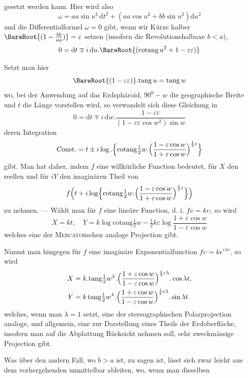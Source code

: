 %
\noindent gesetzt werden kann. Hier wird also
\[
\omega=aa\sin u^2\,\mathrm{d}t^2+(aa\cos u^2+bb\sin u^2)\mathrm{d}u^2
\]
\noindent und die Differentialformel \(\omega=0\) gibt, wenn wir Kürze halber \(\BareRoot{(1-\frac{bb}{aa})}=\varepsilon\) setzen (insofern die Revolutionshalbaxe \(b<a\)),
\[
0=\mathrm{d}t\mp i\,\mathrm{d}u\mathord{.}\BareRoot{(\mathrm{cotang}\,u^2+1-\varepsilon\varepsilon)}
\]

Setzt man hier
\[
\BareRoot{(1-\varepsilon\varepsilon)}\mathord{.}\mathrm{tang}\,u=\mathrm{tang}\,w
\]
\noindent wo, bei der Anwendung auf das Erdsphäroid, \(90^0-w\) die geographische Breite und \(t\) die Länge vorstellen wird, so verwandelt sich diese Gleichung in
\[
0=\mathrm{d}t\mp i\,\mathrm{d}w\mathord{.}\frac{1-\varepsilon\varepsilon}{(1-\varepsilon\varepsilon\cos w^2)\sin w}
\]
\noindent deren Integration
\[
\text{Const.}=t\pm i\log\mathord{.}\Bigl\{\mathrm{cotang}\tfrac{1}{2}w\mathord{.}\Bigl(\frac{1-\varepsilon\cos w}{1+\varepsilon\cos w}\Bigr)^{\frac{1}{2}\varepsilon}\Bigr\}
\]
\noindent gibt. Man hat daher, indem \(f\) eine willkürliche Function bedeutet, für \(X\) den reellen und für \(iY\) den imaginären Theil von
\[
f\Bigl(t+i\log\Bigl\{\mathrm{cotang}\tfrac{1}{2}w\mathord{.}\Bigl(\frac{1-\varepsilon\cos w}{1+\varepsilon\cos w}\Bigr)^{\frac{1}{2}\varepsilon}\Bigr\}\Bigr)
\]
\noindent zu nehmen. --- Wählt man für \(f\) eine lineäre Function, d. i. \(f\upsilon=k\upsilon\), so wird
\[
X=kt,\quad Y=k\log\mathrm{cotang}\tfrac{1}{2}w-\tfrac{1}{2}k\varepsilon\log\frac{1+\varepsilon\cos w}{1-\varepsilon\cos w}
\]
\noindent welches eine der \textsc{Mercator}schen analoge Projection gibt.

Nimmt man hingegen für \(f\) eine imaginäre Exponentialfunction \(f\upsilon=ke^{i\lambda\upsilon}\), so wird
\[
\begin{aligned}
X&=k\mathord{.}\mathrm{tang}\tfrac{1}{2}w^{\lambda}\mathord{.}\Bigl(\frac{1+\varepsilon\cos w}{1-\varepsilon\cos w}\Bigr)^{\frac{1}{2}\varepsilon\lambda}\mathord{.}\cos\lambda t,\\
Y&=k\,\mathrm{tang}\tfrac{1}{2}w^{\lambda}\mathord{.}\Bigl(\frac{1+\varepsilon\cos w}{1-\varepsilon\cos w}\Bigr)^{\frac{1}{2}\varepsilon\lambda}\mathord{.}\sin\lambda t
\end{aligned}
\]
\noindent welches, wenn man \(\lambda=1\) setzt, eine der stereographischen Polarprojection analoge, und allgemein, eine zur Darstellung eines Theils der Erdoberfläche, insofern man auf die Abplattung Rücksicht nehmen soll, sehr zweckmässige Projection gibt.

Was über den andern Fall, wo \(b>a\) ist, zu sagen ist, lässt sich zwar leicht aus dem vorhergehenden unmittelbar ableiten, wo, wenn man dieselben
